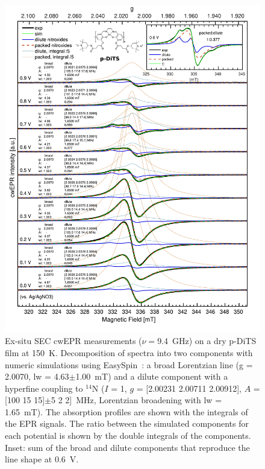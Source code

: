 \begin{figure}[h]
\center
	\includegraphics[width=1\textwidth]{./operando_epr/figures/CRYO/Figure_S7_new.pdf}
	\caption{Ex-situ SEC cwEPR measurements ($\nu=$9.4~GHz) on a dry p-DiTS film at 150~K. Decomposition of spectra into two components with numeric simulations using EasySpin~\cite{Stoll_2006}: a broad Lorentzian line (g = 2.0070, lw = 4.63$\pm$1.00~mT) and a dilute component with a hyperfine coupling to $^{14}$N ($I$ = 1, $g$ = [2.00231 2.00711 2.00912], $A$ = [100 15 15]$\pm$5 2 2]~MHz, Lorentzian broadening with lw = 1.65~mT). The absorption profiles are shown with the integrals of the EPR signals. The ratio between the simulated components for each potential is shown by the double integrals of the components. Inset: sum of the broad and dilute components that reproduce the line shape at 0.6~V.\\}
	\label{fig:cwEPR_CRYO_DiTS_CHG_SIM}
\end{figure}



